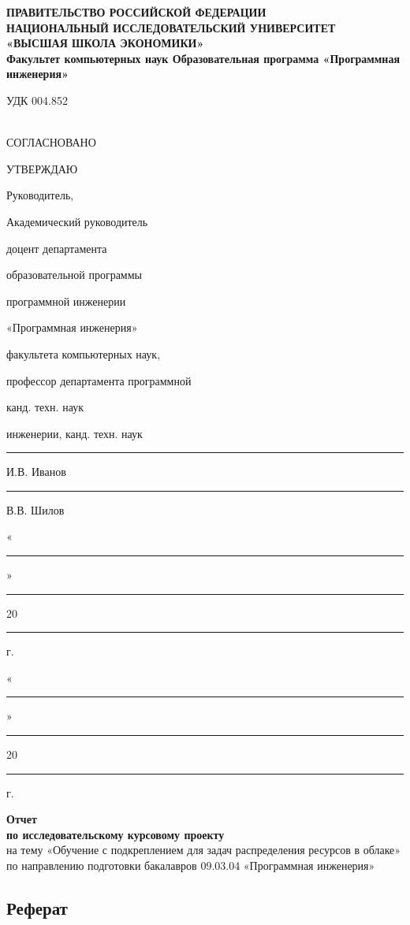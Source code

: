 \documentclass{article}
\newcommand\zz[1]{\par{\normalsize\strut #1} \hfill\ignorespaces}
\begin{document}
 
\begin{center}
\textbf{
ПРАВИТЕЛЬСТВО РОССИЙСКОЙ ФЕДЕРАЦИИ\\
НАЦИОНАЛЬНЫЙ ИССЛЕДОВАТЕЛЬСКИЙ УНИВЕРСИТЕТ\\
«ВЫСШАЯ ШКОЛА ЭКОНОМИКИ»\\
Факультет компьютерных наук
Образовательная программа «Программная инженерия»}\\
\end{center}
УДК 004.852\\
~\\
\zz{СОГЛАСНОВАНО}УТВЕРЖДАЮ
\zz{Руководитель,}Академический руководитель
\zz{доцент департамента}образовательной программы
\zz{программной инженерии}«Программная инженерия»
\zz{факультета компьютерных наук,}профессор департамента программной
\zz{канд. техн. наук}инженерии, канд. техн. наук
\zz{\noindent\rule{3cm}{0.4pt} И.В. Иванов}\noindent\rule{3cm}{0.4pt} В.В. Шилов
\zz{«\noindent\rule{1cm}{0.4pt}»\noindent\rule{2cm}{0.4pt}20\noindent\rule{0.5cm}{0.4pt}г.}«\noindent\rule{1cm}{0.4pt}»\noindent\rule{2cm}{0.4pt}20\noindent\rule{0.5cm}{0.4pt}г.
\begin{center}
\topskip=0pt
\vspace*{\fill}
\textbf{Отчет\\
по исследовательскому курсовому проекту}\\
на тему «Обучение с подкреплением для задач распределения ресурсов в облаке»\\
по направлению подготовки бакалавров 09.03.04 «Программная инженерия»\\
\vspace*{\fill}
\end{center}
{\raggedleft\vfill{}\par
}
\begin{center}
\vspace*{\fill}{
  Москва 2021}
\end{center}
\newpage
\begin{center}
\section {Реферат}
\end{center}
\end{document}
